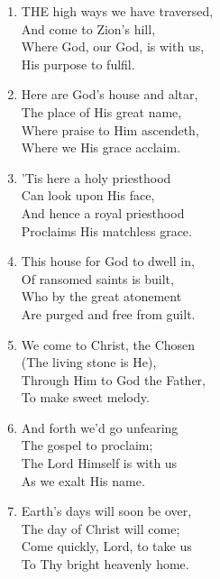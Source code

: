 \documentclass[11pt,a4paper]{article}
\begin{document}
\begin{enumerate}
    \item THE high ways we have traversed, \\
        And come to Zion's hill, \\
        Where God, our God, is with us, \\
        His purpose to fulfil.

    \item Here are God's house and altar, \\
        The place of His great name, \\
        Where praise to Him ascendeth, \\
        Where we His grace acclaim.

    \item 'Tis here a holy priesthood \\
        Can look upon His face, \\
        And hence a royal priesthood \\
        Proclaims His matchless grace.

    \item This house for God to dwell in, \\
        Of ransomed saints is built, \\
        Who by the great atonement \\
        Are purged and free from guilt.

    \item We come to Christ, the Chosen \\
        (The living stone is He), \\
        Through Him to God the Father, \\
        To make sweet melody.

    \item And forth we'd go unfearing \\
        The gospel to proclaim; \\
        The Lord Himself is with us \\
        As we exalt His name.

    \item Earth's days will soon be over, \\
        The day of Christ will come; \\
        Come quickly, Lord, to take us \\
        To Thy bright heavenly home.

\end{enumerate}
\end{document}
